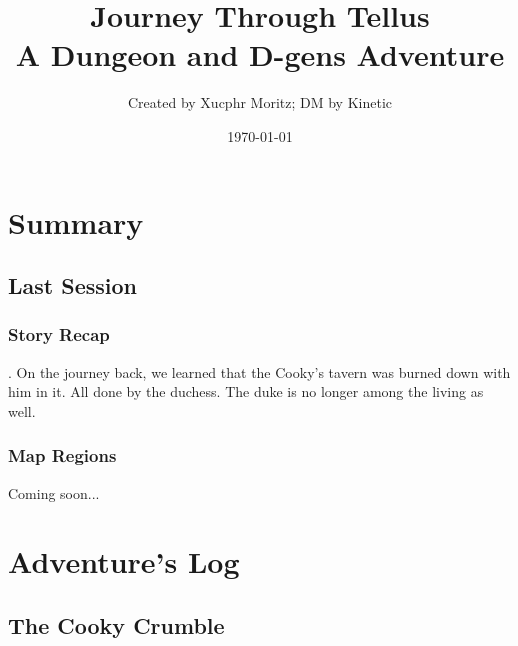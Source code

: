 \documentclass[letterpaper,twocolumn,openany,nodeprecatedcode]{dndbook}
\title{Journey Through Tellus \\
\large A Dungeon and D-gens Adventure}
\author{Created by Xucphr Moritz; DM by Kinetic}
\date{\today}
\begin{document}
\frontmatter

\maketitle

\tableofcontents

\mainmatter%

\part{Summary}


\chapter*{Last Session}
\section{Story Recap}
. On the journey back, we learned that the Cooky's tavern was burned down with him in it.
All done by the duchess. The duke is no longer among the living as well.


\section{Map Regions}
Coming soon...
%




\part{Adventure's Log}
\chapter{The Cooky Crumble}

\end{document}
